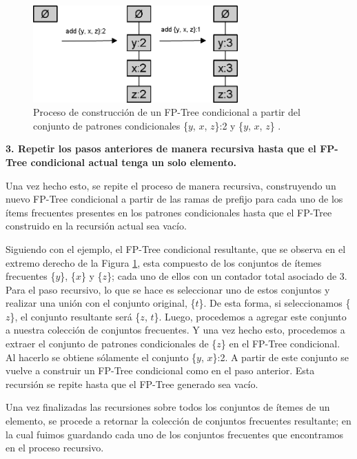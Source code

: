 \begin{figure}[h!]
\begin{center}
\includegraphics[width=0.7\textwidth]{imagenes/cond_fptree.png}
\end{center}
\vspace*{-5mm}
\caption{Proceso de construcción de un FP-Tree condicional a partir del conjunto de patrones condicionales \{$y$, $x$, $z$\}:2 y \{$y$, $x$, $z$\} \cite{harrington2012machine}.}
\label{fig:cond_fptree}
\end{figure}

\textbf{3. Repetir los pasos anteriores de manera recursiva hasta que el FP-Tree condicional actual tenga un solo elemento.}

Una vez hecho esto, se repite el proceso de manera recursiva, construyendo un nuevo FP-Tree condicional a partir de las ramas de prefijo para cada uno de los ítems frecuentes presentes en los patrones condicionales hasta que el FP-Tree construido en la recursión actual sea vacío.

Siguiendo con el ejemplo, el FP-Tree condicional resultante, que se observa en el extremo derecho de la Figura \ref{fig:cond_fptree}, esta compuesto de los conjuntos de ítemes frecuentes \{$y$\}, \{$x$\} y \{$z$\}; cada uno de ellos con un contador total asociado de 3. Para el paso recursivo, lo que se hace es seleccionar uno de estos conjuntos y realizar una unión con el conjunto original, \{$t$\}. De esta forma, si seleccionamos \{$z$\}, el conjunto resultante será \{$z$, $t$\}. Luego, procedemos a agregar este conjunto a nuestra colección de conjuntos frecuentes. Y una vez hecho esto, procedemos a extraer el conjunto de patrones condicionales de \{$z$\} en el FP-Tree condicional. Al hacerlo se obtiene sólamente el conjunto \{$y$, $x$\}:2. A partir de este conjunto se vuelve a construir un FP-Tree condicional como en el paso anterior. Esta recursión se repite hasta que el FP-Tree generado sea vacío.

Una vez finalizadas las recursiones sobre todos los conjuntos de ítemes de un elemento, se procede a retornar la colección de conjuntos frecuentes resultante; en la cual fuimos guardando cada uno de los conjuntos frecuentes que encontramos en el proceso recursivo.

